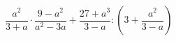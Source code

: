 \begin{ex}[type=expression]
	\begin{condition}
		\(\dfrac{a^2}{3+a}\cdot\dfrac{9-a^2}{a^2-3a}+\dfrac{27+a^3}{3-a}:\left( 3+\dfrac{a^2}{3-a} \right)\)
	\end{condition}
\end{ex}